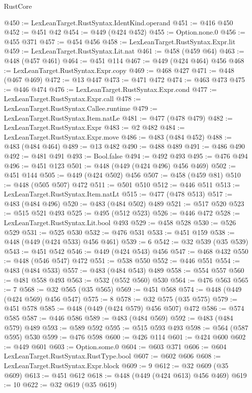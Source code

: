 \begin{lexlean}{RustCore}
\begin{coremodule}
@450 := LexLeanTarget.RustSyntax.IdentKind.operand
@451 := @416 @450
@452 := @451 @42
@454 := @449 (@424 @452)
@455 := Option.none.{0}
@456 := @455 @371
@457 := @454 @456
@458 := LexLeanTarget.RustSyntax.Expr.lit
@459 := LexLeanTarget.RustSyntax.Lit.nat
@461 := @458 (@459 @64)
@463 := @448 (@457 @461)
@464 := @451 @114
@467 := @449 (@424 @464) @456
@468 := LexLeanTarget.RustSyntax.Expr.copy
@469 := @468 @427
@471 := @448 (@467 @469)
@472 := @13 @447
@473 := @471 @472
@474 := @463 @473
@475 := @446 @474
@476 := LexLeanTarget.RustSyntax.Expr.cond
@477 := LexLeanTarget.RustSyntax.Expr.call
@478 := LexLeanTarget.RustSyntax.Callee.runtime
@479 := LexLeanTarget.RustSyntax.Item.natLe
@481 := @477 (@478 @479)
@482 := LexLeanTarget.RustSyntax.Expr
@483 := @2 @482
@484 := LexLeanTarget.RustSyntax.Expr.move
@486 := @483 (@484 @452)
@488 := @483 (@484 @464)
@489 := @13 @482
@490 := @488 @489
@491 := @486 @490
@492 := @481 @491
@493 := Bool.false
@494 := @492 @493
@495 := @476 @494
@496 := @451 @123
@501 := @448 (@449 (@424 @496) @456 @469)
@502 := @451 @144
@505 := @449 (@424 @502) @456
@507 := @458 (@459 @81)
@510 := @448 (@505 @507) @472
@511 := @501 @510
@512 := @446 @511
@513 := LexLeanTarget.RustSyntax.Item.natLt
@515 := @477 (@478 @513)
@517 := @483 (@484 @496)
@520 := @483 (@484 @502) @489
@521 := @517 @520
@523 := @515 @521 @493
@525 := @495 (@512 @523)
@526 := @446 @472
@528 := LexLeanTarget.RustSyntax.Lit.bool @493
@529 := @458 @528
@530 := @526 @529
@531 := @525 @530
@532 := @476 @531
@533 := @451 @159
@538 := @448 (@449 (@424 @533) @456 @461)
@539 := 6
@542 := @32 @539 (@35 @539)
@543 := @451 @542
@546 := @449 (@424 @543) @456
@547 := @468 @432
@550 := @448 (@546 @547) @472
@551 := @538 @550
@552 := @446 @551
@554 := @483 (@484 @533)
@557 := @483 (@484 @543) @489
@558 := @554 @557
@560 := @481 @558 @493
@563 := @532 (@552 @560) @530
@564 := @476 @563
@565 := 7
@568 := @32 @565 (@35 @565)
@569 := @451 @568
@574 := @448 (@449 (@424 @569) @456 @547)
@575 := 8
@578 := @32 @575 (@35 @575)
@579 := @451 @578
@585 := @448 (@449 (@424 @579) @456 @507) @472
@586 := @574 @585
@587 := @446 @586
@589 := @483 (@484 @569)
@592 := @483 (@484 @579) @489
@593 := @589 @592
@595 := @515 @593 @493
@598 := @564 (@587 @595) @530
@599 := @476 @598
@600 := @426 @114
@601 := @424 @600
@602 := @449 @601
@603 := Option.some.{0}
@604 := @603 @371
@606 := @604 LexLeanTarget.RustSyntax.RustType.bool
@607 := @602 @606
@608 := LexLeanTarget.RustSyntax.Expr.block
@609 := 9
@612 := @32 @609 (@35 @609)
@613 := @451 @612
@618 := @448 (@449 (@424 @613) @456 @469)
@619 := 10
@622 := @32 @619 (@35 @619)

\end{coremodule}
\end{lexlean}

